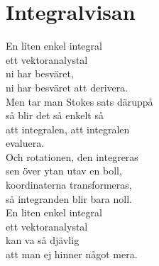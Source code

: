 \section{Integralvisan}
En liten enkel integral\\
ett vektoranalystal\\
ni har besväret,\\
ni har besväret att derivera.\\
Men tar man Stokes sats däruppå\\
så blir det så enkelt så\\
att integralen, att integralen\\
evaluera.\\

Och rotationen, den integreras\\
sen över ytan utav en boll,\\
koordinaterna transformeras,\\
så integranden blir bara noll.\\

En liten enkel integral\\
ett vektoranalystal\\
kan va så djävlig\\
att man ej hinner något mera.\\